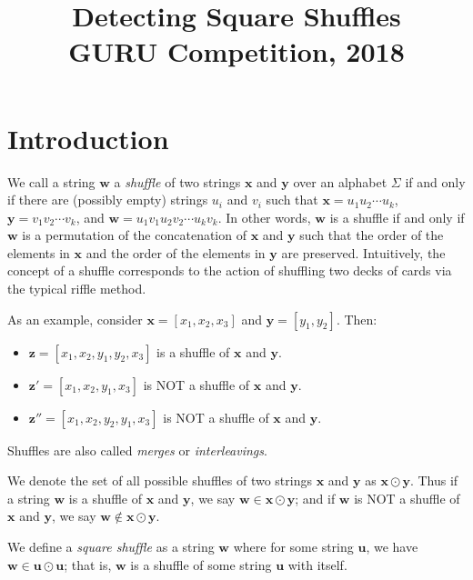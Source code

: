 \documentclass{article}[12pt]
\title{Detecting Square Shuffles \\ GURU Competition, 2018}
\author{}
\date{}
\begin{document}
 \maketitle


\section{Introduction}

We call a string $\mathbf{w}$ a {\it shuffle} of two strings $\mathbf{x}$ and $\mathbf{y}$ over an alphabet $\Sigma$ if and only if there are (possibly empty) strings $u_{i}$ and $v_{i}$ such that $\mathbf{x} = u_{1} u_{2} \cdots u_{k}$, $\mathbf{y} = v_{1} v_{2} \cdots v_{k}$, and $\mathbf{w} = u_{1} v_{1} u_{2} v_{2} \cdots u_{k} v_{k}$. In other words, $\mathbf{w}$ is a shuffle if and only if $\mathbf{w}$ is a permutation of the concatenation of $\mathbf{x}$ and $\mathbf{y}$ such that the order of the elements in $\mathbf{x}$ and the order of the elements in $\mathbf{y}$ are preserved. Intuitively, the concept of a shuffle corresponds to the action of shuffling two decks of cards via the typical riffle method.

As an example, consider $\mathbf{x} = [ x_{1}, x_{2}, x_{3} ]$ and $\mathbf{y} = [ y_{1}, y_{2} ]$. Then:
\begin{itemize}
\item[] $\mathbf{z} = [ x_{1}, x_{2}, y_{1}, y_{2}, x_{3} ]$ is a shuffle of $\mathbf{x}$ and $\mathbf{y}$.
\item[] $\mathbf{z}' = [ x_{1}, x_{2}, y_{1}, x_{3} ]$ is NOT a shuffle of $\mathbf{x}$ and $\mathbf{y}$.
\item[] $\mathbf{z}'' = [x_{1}, x_{2}, y_{2}, y_{1}, x_{3} ]$ is NOT a shuffle of $\mathbf{x}$ and $\mathbf{y}$.
\end{itemize}
Shuffles are also called {\it merges} or {\it interleavings}.

We denote the set of all possible shuffles of two strings $\mathbf{x}$ and $\mathbf{y}$ as $\mathbf{x} \odot \mathbf{y}$. Thus if a string $\mathbf{w}$ is a shuffle of $\mathbf{x}$ and $\mathbf{y}$, we say $\mathbf{w} \in \mathbf{x} \odot \mathbf{y}$; and if $\mathbf{w}$ is NOT a shuffle of $\mathbf{x}$ and $\mathbf{y}$, we say $\mathbf{w} \notin \mathbf{x} \odot \mathbf{y}$.

We define a {\it square shuffle} as a string $\mathbf{w}$ where for some string $\mathbf{u}$, we have $\mathbf{w} \in \mathbf{u} \odot \mathbf{u}$; that is, $\mathbf{w}$ is a shuffle of some string $\mathbf{u}$ with itself.
\end{document}
